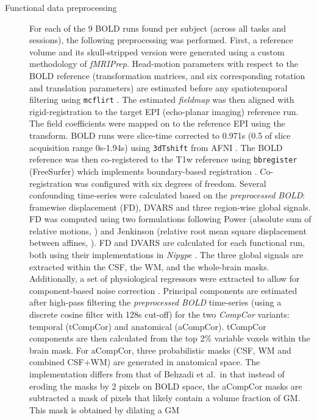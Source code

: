 \documentclass[
]{article}
\begin{document}
\begin{description}
\item[Functional data preprocessing]
For each of the 9 BOLD runs found per subject (across all tasks and
sessions), the following preprocessing was performed. First, a reference
volume and its skull-stripped version were generated using a custom
methodology of \emph{fMRIPrep}. Head-motion parameters with respect to
the BOLD reference (transformation matrices, and six corresponding
rotation and translation parameters) are estimated before any
spatiotemporal filtering using \texttt{mcflirt} \citep[FSL
6.0.5.1:57b01774,][]{mcflirt}. The estimated \emph{fieldmap} was then
aligned with rigid-registration to the target EPI (echo-planar imaging)
reference run. The field coefficients were mapped on to the reference
EPI using the transform. BOLD runs were slice-time corrected to 0.971s
(0.5 of slice acquisition range 0s-1.94s) using \texttt{3dTshift} from
AFNI \citep[RRID:SCR\_005927]{afni}. The BOLD reference was then
co-registered to the T1w reference using \texttt{bbregister}
(FreeSurfer) which implements boundary-based registration \citep{bbr}.
Co-registration was configured with six degrees of freedom. Several
confounding time-series were calculated based on the \emph{preprocessed
BOLD}: framewise displacement (FD), DVARS and three region-wise global
signals. FD was computed using two formulations following Power
(absolute sum of relative motions, \citet{power_fd_dvars}) and Jenkinson
(relative root mean square displacement between affines,
\citet{mcflirt}). FD and DVARS are calculated for each functional run,
both using their implementations in \emph{Nipype} \citep[following the
definitions by][]{power_fd_dvars}. The three global signals are
extracted within the CSF, the WM, and the whole-brain masks.
Additionally, a set of physiological regressors were extracted to allow
for component-based noise correction \citep[\emph{CompCor},][]{compcor}.
Principal components are estimated after high-pass filtering the
\emph{preprocessed BOLD} time-series (using a discrete cosine filter
with 128s cut-off) for the two \emph{CompCor} variants: temporal
(tCompCor) and anatomical (aCompCor). tCompCor components are then
calculated from the top 2\% variable voxels within the brain mask. For
aCompCor, three probabilistic masks (CSF, WM and combined CSF+WM) are
generated in anatomical space. The implementation differs from that of
Behzadi et al.~in that instead of eroding the masks by 2 pixels on BOLD
space, the aCompCor masks are subtracted a mask of pixels that likely
contain a volume fraction of GM. This mask is obtained by dilating a GM

\end{description}
\end{document}

